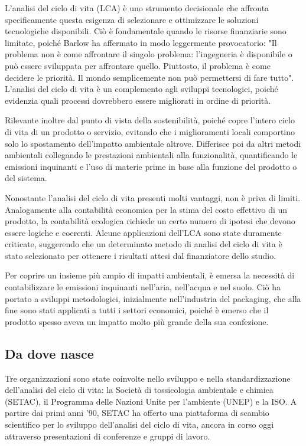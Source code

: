L'analisi del ciclo di vita (LCA) è uno strumento decisionale che affronta specificamente questa esigenza di selezionare e ottimizzare le soluzioni tecnologiche disponibili. Ciò è fondamentale quando le risorse finanziarie sono limitate, poiché Barlow ha affermato in modo leggermente provocatorio: "Il problema non è come affrontare il singolo problema: l'ingegneria è disponibile o può essere sviluppata per affrontare quello. Piuttosto, il problema è come decidere le priorità. Il mondo semplicemente non può permettersi di fare tutto". L'analisi del ciclo di vita è un complemento agli sviluppi tecnologici, poiché evidenzia quali processi dovrebbero essere migliorati in ordine di priorità.

Rilevante inoltre dal punto di vista della sostenibilità, poiché copre l'intero ciclo di vita di un prodotto o servizio, evitando che i miglioramenti locali comportino solo lo spostamento dell'impatto ambientale altrove. Differisce poi da altri metodi ambientali collegando le prestazioni ambientali alla funzionalità, quantificando le emissioni inquinanti e l'uso di materie prime in base alla funzione del prodotto o del sistema.

Nonostante l'analisi del ciclo di vita presenti molti vantaggi, non è priva di limiti. Analogamente alla contabilità economica per la stima del costo effettivo di un prodotto, la contabilità ecologica richiede un certo numero di ipotesi che devono essere logiche e coerenti. Alcune applicazioni dell'LCA sono state duramente criticate, suggerendo che un determinato metodo di analisi del ciclo di vita è stato selezionato per ottenere i risultati attesi dal finanziatore dello studio.

Per coprire un insieme più ampio di impatti ambientali, è emersa la necessità di contabilizzare le emissioni inquinanti nell'aria, nell'acqua e nel suolo. Ciò ha portato a sviluppi metodologici, inizialmente nell'industria del packaging, che alla fine sono stati applicati a tutti i settori economici, poiché è emerso che il prodotto spesso aveva un impatto molto più grande della sua confezione.
\subsection{Da dove nasce}
Tre organizzazioni sono state coinvolte nello sviluppo e nella standardizzazione dell'analisi del ciclo di vita: la Società di tossicologia ambientale e chimica (SETAC), il Programma delle Nazioni Unite per l'ambiente (UNEP) e la ISO. A partire dai primi anni '90, SETAC ha offerto una piattaforma di scambio scientifico per lo sviluppo dell'analisi del ciclo di vita, ancora in corso oggi attraverso presentazioni di conferenze e gruppi di lavoro.

